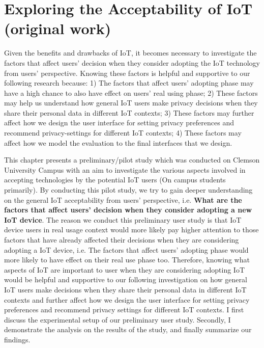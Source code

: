 
\chapter{Exploring the Acceptability of IoT (original work)}\label{chapter:acceptability}

Given the benefits and drawbacks of IoT, it becomes necessary to investigate the factors that affect users’ decision when they consider adopting the IoT technology from users' perspective. Knowing these factors is helpful and supportive to our following research because: 1) The factors that affect users' adopting phase may have a high chance to also have effect on users' real using phase; 2) These factors may help us understand how general IoT users make privacy decisions when they share their personal data in different IoT contexts; 3) These factors may further affect how we design the user interface for setting privacy preferences and recommend privacy-settings for different IoT contexts; 4) These factors may affect how we model the evaluation to the final interfaces that we design.

This chapter presents a preliminary/pilot study which was conducted on Clemson University Campus with an aim to investigate the various aspects involved in accepting technologies by the potential IoT users (On campus students primarily). By conducting this pilot study, we try to gain deeper understanding on the general IoT acceptability from users' perspective, i.e. \textbf{What are the factors that affect users' decision when they consider adopting a new IoT device}. The reason we conduct this preliminary user study is that IoT device users in real usage context would more likely pay higher attention to those factors that have already affected their decisions when they are considering adopting a IoT device, i.e. The factors that affect users' adopting phase would more likely to have effect on their real use phase too. Therefore, knowing what aspects of IoT are important to user when they are considering adopting IoT would be helpful and supportive to our following investigation on how general IoT users make decisions when they share their personal data in different IoT contexts and further affect how we design the user interface for setting privacy preferences and recommend privacy settings for different IoT contexts. I first discuss the experimental setup of our preliminary user study. Secondly, I demonstrate the analysis on the results of the study, and finally summarize our findings.

